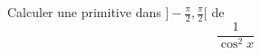  Calculer une primitive dans $]-\frac{\pi}{2},\frac{\pi}{2}[$ de
\[\frac{1}{\cos ^{2}x} \]
\bigskip\bigskip 